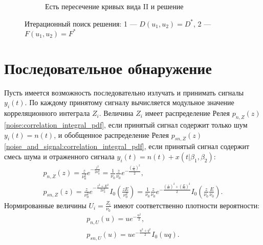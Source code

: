 \documentclass[a4paper,12pt]{article}
\begin{document}
\begin{figure}[h]
\begin{subfigure}{0.3\textwidth}
            \caption{Есть пересечение кривых вида II и решение}
        \end{subfigure}

        \caption{Итерационный поиск решения: 1 --- $D (u_1, u_2) = D^*$, 2 --- $F (u_1, u_2) = F^*$}
        \label{figure:two_state_detection:iterations}
    \end{figure}


    \section{Последовательное обнаружение}

    Пусть имеется возможность последовательно излучать и принимать сигналы $y_i(t)$. По каждому принятому сигналу вычисляется модульное значение корреляционного интеграла
    $Z_i$. Величина $Z_i$ имеет распределение Релея $p_{n,Z}(z)$ \eqref{noise:correlation_integral_pdf}, если принятый сигнал содержит только шум $y_i(t) = n(t)$, и
    обобщенное распределение Релея $p_{sn,Z}(z)$ \eqref{noise_and_signal:correlation_integral_pdf}, если принятый сигнал содержит смесь шума и отраженного сигнала
    $y_i(t) = n(t) + x(t|\beta_1, \beta_2)$:
    \begin{gather*}
        p_{n,Z}(z)
        = \frac{z}{\nu_0^2} e^{- \frac{z^2}{2 \nu_0^2}}
        = \frac{1}{\nu_0} \frac{z}{\nu_0} e^{- \frac{\left ( \frac{z}{\nu_0} \right )^2}{2}} , \\
        p_{sn,Z}(z)
        = \frac{z}{\nu_0^2} e^{- \frac{z^2 + E^2}{2 \nu_0^2}} I_0 \left ( \frac{z E}{\nu_0^2} \right )
        = \frac{1}{\nu_0} \frac{z}{\nu_0} e^{- \frac{\left ( \frac{z}{\nu_0} \right)^2 + \left ( \frac{E}{\nu_0} \right)^2}{2}} I_0 \left ( \frac{z}{\nu_0} \frac{E}{\nu_0} \right ).
    \end{gather*}
    Нормированные величины $U_i = \frac{Z_i}{\nu_0}$ имеют соответственно плотности вероятности:
    \begin{gather*}
        p_{n,U}(u) = u e^{- \frac{u^2}{2}} , \\
        p_{sn,U}(u) = u e^{- \frac{u^2 + q^2}{2}} I_0 \left ( u q \right ) .
    \end{gather*}
\end{document}
